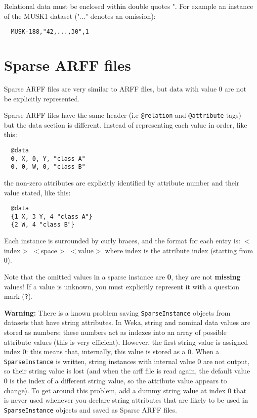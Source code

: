 \noindent Relational data must be enclosed within double quotes ". For example an instance of the MUSK1 dataset ("..." denotes an omission):

\begin{verbatim}
  MUSK-188,"42,...,30",1
\end{verbatim}


\section{Sparse ARFF files}
Sparse ARFF files are very similar to ARFF files, but data with value 0 are not be explicitly represented.

Sparse ARFF files have the same header (i.e \texttt{@relation} and \texttt{@attribute} tags) but the data section is different. Instead of representing each value in order, like this:

\begin{verbatim}
  @data
  0, X, 0, Y, "class A"
  0, 0, W, 0, "class B"
\end{verbatim}

\noindent the non-zero attributes are explicitly identified by attribute number and their value stated, like this:

\begin{verbatim}
  @data
  {1 X, 3 Y, 4 "class A"}
  {2 W, 4 "class B"}
\end{verbatim}

\noindent Each instance is surrounded by curly braces, and the format for each entry is: $<$index$>$ $<$space$>$ $<$value$>$ where index is the attribute index (starting from 0).

Note that the omitted values in a sparse instance are \textbf{0}, they are not \textbf{missing} values! If a value is unknown, you must explicitly represent it with a question mark (\texttt{?}).

\textbf{Warning:} There is a known problem saving \texttt{SparseInstance} objects from datasets that have string attributes. In Weka, string and nominal data values are stored as numbers; these numbers act as indexes into an array of possible attribute values (this is very efficient). However, the first string value is assigned index 0: this means that, internally, this value is stored as a 0. When a \texttt{SparseInstance} is written, string instances with internal value 0 are not output, so their string value is lost (and when the arff file is read again, the default value 0 is the index of a different string value, so the attribute value appears to change). To get around this problem, add a dummy string value at index 0 that is never used whenever you declare string attributes that are likely to be used in \texttt{SparseInstance} objects and saved as Sparse ARFF files.

